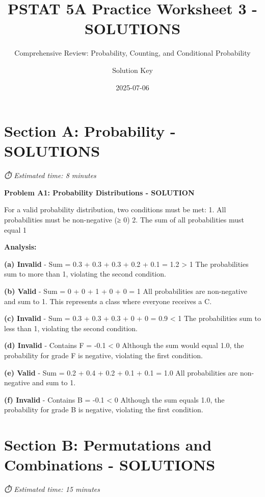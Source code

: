 \documentclass[
  11pt,
]{article}
\title{PSTAT 5A Practice Worksheet 3 - SOLUTIONS}
\subtitle{Comprehensive Review: Probability, Counting, and Conditional
Probability}
\author{Solution Key}
\date{2025-07-06}
\renewcommand*\contentsname{Table of contents}
\newcommand\contentsname{Table of contents}
\begin{document}
\maketitle

\renewcommand*\contentsname{Table of contents}
{
\hypersetup{linkcolor=}
\setcounter{tocdepth}{3}
\tableofcontents
}

\section{Section A: Probability -
SOLUTIONS}\label{section-a-probability---solutions}

\emph{⏱️ Estimated time: 8 minutes}

\textbf{Problem A1: Probability Distributions - SOLUTION}

For a valid probability distribution, two conditions must be met: 1. All
probabilities must be non-negative (≥ 0) 2. The sum of all probabilities
must equal 1

\textbf{Analysis:}

\textbf{(a) Invalid} - Sum = 0.3 + 0.3 + 0.3 + 0.2 + 0.1 = 1.2
\textgreater{} 1 The probabilities sum to more than 1, violating the
second condition.

\textbf{(b) Valid} - Sum = 0 + 0 + 1 + 0 + 0 = 1 All probabilities are
non-negative and sum to 1. This represents a class where everyone
receives a C.

\textbf{(c) Invalid} - Sum = 0.3 + 0.3 + 0.3 + 0 + 0 = 0.9 \textless{} 1
The probabilities sum to less than 1, violating the second condition.

\textbf{(d) Invalid} - Contains F = -0.1 \textless{} 0 Although the sum
would equal 1.0, the probability for grade F is negative, violating the
first condition.

\textbf{(e) Valid} - Sum = 0.2 + 0.4 + 0.2 + 0.1 + 0.1 = 1.0 All
probabilities are non-negative and sum to 1.

\textbf{(f) Invalid} - Contains B = -0.1 \textless{} 0 Although the sum
equals 1.0, the probability for grade B is negative, violating the first
condition.

\section{Section B: Permutations and Combinations -
SOLUTIONS}\label{section-b-permutations-and-combinations---solutions}

\emph{⏱️ Estimated time: 15 minutes}
\end{document}
